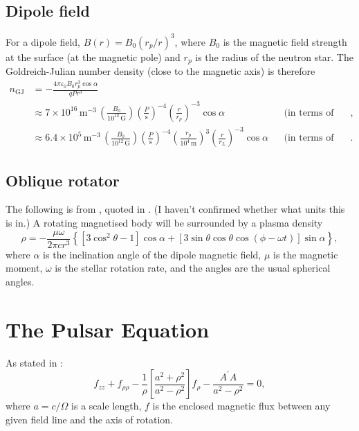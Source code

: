 \documentclass{book}
\begin{document}
\subsection{Dipole field}

For a dipole field, $B(r) = B_0 (r_p/r)^3$, where $B_0$ is the magnetic field strength at the surface (at the magnetic pole) and $r_p$ is the radius of the neutron star.
The Goldreich-Julian number density (close to the magnetic axis) is therefore
\begin{equation}
    \begin{aligned}
    n_\text{GJ}
        &= -\frac{4\pi\varepsilon_0 B_0 r_p^3 \cos\alpha}{qPr^3} \\
        &\approx 7 \times 10^{16}\,\text{m}^{-3} \, \left(\frac{B_0}{10^{12}\,\text{G}}\right) \left(\frac{P}{\text{s}}\right)^{-4} \left(\frac{r}{r_p}\right)^{-3} \cos\alpha & & \text{(in terms of the stellar radius)}, \\
        &\approx 6.4 \times 10^5\,\text{m}^{-3} \, \left(\frac{B_0}{10^{12}\,\text{G}}\right) \left(\frac{P}{\text{s}}\right)^{-4} \left(\frac{r_p}{10^4\,\text{m}}\right)^3 \left(\frac{r}{r_L}\right)^{-3} \cos\alpha & & \text{(in terms of the light cylinder radius)}.
    \end{aligned}
\end{equation}


\subsection{Oblique rotator}

The following is from \citet{Hones1965}, quoted in \citet{Michel2004}.
(I haven't confirmed whether what units this is in.)
A rotating magnetised body will be surrounded by a plasma density
\begin{equation}
    \rho = -\frac{\mu\omega}{2\pi cr^3} \left\{ [ 3 \cos^2\theta - 1 ] \cos\alpha + \left[ 3 \sin\theta \cos\theta \cos(\phi - \omega t) \right] \sin\alpha \right \},
\end{equation}
where $\alpha$ is the inclination angle of the dipole magnetic field, $\mu$ is the magnetic moment, $\omega$ is the stellar rotation rate, and the angles are the usual spherical angles.

\section{The Pulsar Equation}

As stated in \citet{Michel1982}:
\begin{equation}
    f_{zz} + f_{\rho\rho} - \frac{1}{\rho}\left[\frac{a^2 + \rho^2}{a^2 - \rho^2}\right] f_\rho -
    \frac{A^\prime A}{a^2 - \rho^2} = 0,
\end{equation}
where $a = c/\Omega$ is a scale length, $f$ is the enclosed magnetic flux between any given field line and the axis of rotation.
\end{document}
